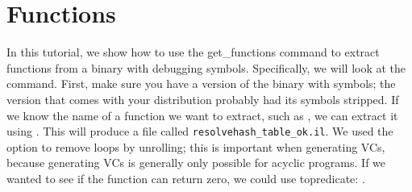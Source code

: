 \section{Functions}

In this tutorial, we show how to use the get\_functions command to
extract functions from a binary with debugging symbols.  Specifically,
we will look at the  command.  First, make sure you
have a version of the binary with symbols; the version that comes with
your distribution probably had its symbols stripped.  If we know the
name of a function we want to extract, such as
, we can extract it using
.  This will
produce a file called \texttt{resolvehash\_table\_ok.il}. We used the
 option to remove loops by unrolling; this is
important when generating VCs, because generating VCs is generally
only possible for acyclic programs. If we wanted to see if the
function can return zero, we could use topredicate:
.

